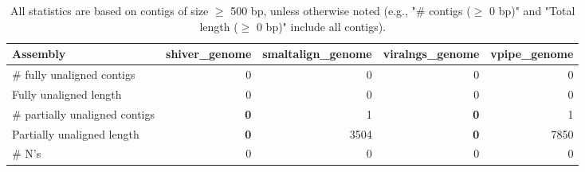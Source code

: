 \documentclass[12pt,a4paper]{article}
\begin{document}
\begin{table}[ht]
\begin{center}
\caption{All statistics are based on contigs of size $\geq$ 500 bp, unless otherwise noted (e.g., "\# contigs ($\geq$ 0 bp)" and "Total length ($\geq$ 0 bp)" include all contigs).}
\begin{tabular}{|l*{4}{|r}|}
\hline
Assembly & shiver\_genome & smaltalign\_genome & viralngs\_genome & vpipe\_genome \\ \hline
\# fully unaligned contigs & 0 & 0 & 0 & 0 \\ \hline
Fully unaligned length & 0 & 0 & 0 & 0 \\ \hline
\# partially unaligned contigs & {\bf 0} & 1 & {\bf 0} & 1 \\ \hline
Partially unaligned length & {\bf 0} & 3504 & {\bf 0} & 7850 \\ \hline
\# N's & 0 & 0 & 0 & 0 \\ \hline
\end{tabular}
\end{center}
\end{table}
\end{document}
